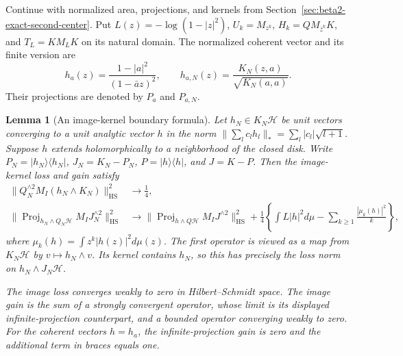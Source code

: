 \documentclass[11pt,a4paper]{article}
\numberwithin{equation}{section}
\newtheorem{lemma}[theorem]{Lemma}
\theoremstyle{definition}
\theoremstyle{remark}
\begin{document}
Continue with normalized area, projections, and kernels from
Section~\ref{sec:beta2-exact-second-center}.  Put
$L(z)=-\log(1-|z|^2)$, $U_k=M_{z^k}$,
$H_k=QM_{\bar z^k}K$, and $T_L=KM_LK$ on its natural domain.
The normalized coherent vector and its finite version are
\[
 h_a(z)=\frac{1-|a|^2}{(1-\bar a z)^2},\qquad
 h_{a,N}(z)=\frac{K_N(z,a)}{\sqrt{K_N(a,a)}}.
\]
Their projections are denoted by $P_a$ and $P_{a,N}$.

\begin{lemma}[An image-kernel boundary formula]
\label{lem:beta2-general-image-boundary}
Let $h_N\in K_N\mathcal H$ be unit vectors converging to a unit
analytic vector $h$ in the norm
$\|\sum_l c_lh_l\|_* =\sum_l|c_l|\sqrt{l+1}$.
Suppose $h$ extends holomorphically to a neighborhood of the closed
disk.  Write $P_N=|h_N\rangle\langle h_N|$, $J_N=K_N-P_N$,
$P=|h\rangle\langle h|$, and $J=K-P$.  Then the image-kernel loss
and gain satisfy
\begin{align}
 \|Q_N^{\wedge2}M_I(h_N\wedge K_N)\|_{\mathrm{HS}}^2
   &\longrightarrow\frac14,\label{eq:beta2-general-image-loss}\\
 \|\operatorname{Proj}_{h_N\wedge Q_N\mathcal H}
                        M_IJ_N^{\wedge2}\|_{\mathrm{HS}}^2
   &\longrightarrow
     \|\operatorname{Proj}_{h\wedge Q\mathcal H}
                        M_IJ^{\wedge2}\|_{\mathrm{HS}}^2
       +\frac14\left\{\int L|h|^2d\mu
              -\sum_{k\ge1}\frac{|\mu_k(h)|^2}{k}\right\},
       \label{eq:beta2-general-image-gain}
\end{align}
where $\mu_k(h)=\int z^k|h(z)|^2d\mu(z)$.  The first operator is
viewed as a map from $K_N\mathcal H$ by $v\mapsto h_N\wedge v$.
Its kernel contains $h_N$, so this has precisely the loss norm on
$h_N\wedge J_N\mathcal H$.

The image loss converges weakly to zero in Hilbert--Schmidt space.
The image gain is the sum of a strongly convergent operator, whose
limit is its displayed infinite-projection counterpart, and a
bounded operator converging weakly to zero.  For the coherent
vectors $h=h_a$, the infinite-projection gain is zero and the
additional term in braces equals one.
\end{lemma}
\end{document}

